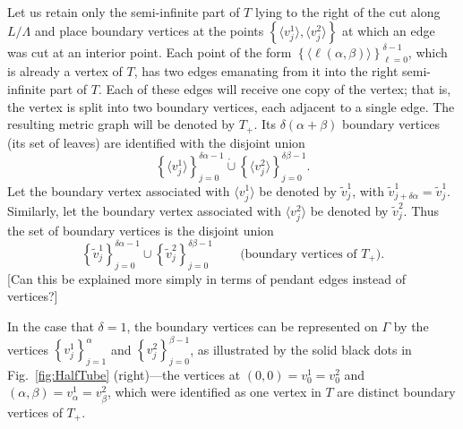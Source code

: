\documentclass[12pt]{article}
\newcommand{\notesps}[1]{{\color[rgb]{1,0.5,0}[#1]}}
\begin{document}
Let us retain only the semi-infinite part of $T$ lying to the right of the cut along $L/\Lambda$ and place boundary vertices at the points $\left\{ \langle v^1_j \rangle, \langle v^2_j \rangle \right\}$ at which an edge was cut at an interior point.  Each point of the form $\left\{ \langle \ell(\alpha,\beta) \rangle \right\}_{\ell=0}^{\delta-1}$, which is already a vertex of $T$, has two edges emanating from it into the right semi-infinite part of $T$.  Each of these edges will receive one copy of the vertex; that is, the vertex is split into two boundary vertices, each adjacent to a single edge.  The resulting metric graph will be denoted by $T_+$.  Its $\delta(\alpha+\beta)$ boundary vertices (its set of leaves) are identified with the disjoint union
%
\begin{equation}
  \left\{ \langle v^1_j \rangle \right\}_{j=0}^{\delta\alpha-1}
   \mathring{\cup}
  \left\{ \langle v^2_j \rangle \right\}_{j=0}^{\delta\beta-1}.
\end{equation}
%
Let the boundary vertex associated with $\langle v^1_j \rangle$ be denoted by $\tilde v^1_j$, with $\tilde v^1_{j+\delta\alpha}=\tilde v^1_j$.  Similarly, let the boundary vertex associated with $\langle v^2_j \rangle$ be denoted by $\tilde v^2_j$.  Thus the set of boundary vertices is the disjoint union
%
\begin{equation}
  \left\{ \tilde v^1_j \right\}_{j=0}^{\delta\alpha-1}
  \cup
  \left\{ \tilde v^2_j \right\}_{j=0}^{\delta\beta-1}\,
   \qquad
    \text{(boundary vertices of $T_+$)}.
\end{equation}
%
\notesps{Can this be explained more simply in terms of pendant edges instead of vertices?}

In the case that $\delta=1$, the boundary vertices can be represented on $\Gamma$ by the vertices $\left\{ v^1_j \right\}_{j=1}^\alpha$ and $\left\{ v^2_j \right\}_{j=0}^{\beta-1}$, as illustrated by the solid black dots in Fig.~\ref{fig:HalfTube} (right)---the vertices at $(0,0)=v^1_0=v^2_0$ and $(\alpha,\beta)=v^1_\alpha=v^2_\beta$, which were identified as one vertex in $T$ are distinct boundary vertices of $T_+$.
\end{document}
